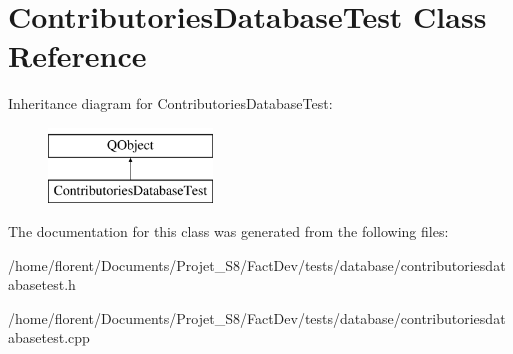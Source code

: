 \hypertarget{classContributoriesDatabaseTest}{\section{Contributories\-Database\-Test Class Reference}
\label{classContributoriesDatabaseTest}
}
Inheritance diagram for Contributories\-Database\-Test\-:\begin{figure}[H]
\begin{center}
\leavevmode
\includegraphics[height=2.000000cm]{d8/df7/classContributoriesDatabaseTest}
\end{center}
\end{figure}


The documentation for this class was generated from the following files\-:\begin{DoxyCompactItemize}
\item 
/home/florent/\-Documents/\-Projet\-\_\-\-S8/\-Fact\-Dev/tests/database/contributoriesdatabasetest.\-h\item 
/home/florent/\-Documents/\-Projet\-\_\-\-S8/\-Fact\-Dev/tests/database/contributoriesdatabasetest.\-cpp\end{DoxyCompactItemize}
